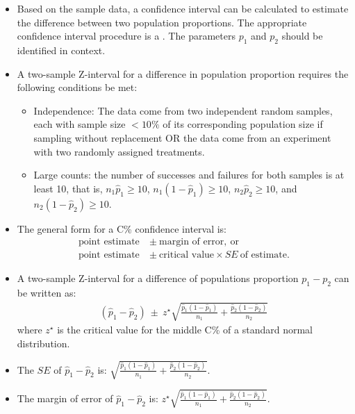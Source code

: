 \begin{itemize}
\item Based on the sample data, a confidence interval can be calculated to
estimate the difference between two population proportions. The appropriate
confidence interval procedure is a .  The parameters $p_1$ and $p_2$ should be identified in context.

\item A two-sample Z-interval for a difference in population proportion requires the following conditions be met:
\begin{itemize}
\item[1.] Independence:  The data come from two independent random samples, each with sample size $<10\%$ of its corresponding population size if sampling without replacement OR the data come from an experiment with two randomly assigned treatments.
\item[2.] Large counts: the number of successes and failures for both samples is at least 10, that is, $n_1\hat{p}_1\ge 10$, $n_1(1-\hat{p}_1)\ge 10$, $n_2\hat{p}_2\ge 10$, and $n_2(1-\hat{p}_2)\ge 10$.
\end{itemize}

\item The general form for a C\% confidence interval is: 
\begin{align*}
\text{point estimate}\ &\pm\ \text{margin of error}, \ \text{or}\\
\text{point estimate}\ &\pm\ \text{critical value} \times SE\ \text{of estimate}.
\end{align*}

\item A two-sample Z-interval for a difference of populations proportion $p_1-p_2$ can be written as:
\begin{align*}
(\hat{p}_1-\hat{p}_2)\  \pm \  z^{\star}\sqrt{\frac{\hat{p}_1(1-\hat{p}_1)}{n_1} + \frac{\hat{p}_2(1-\hat{p}_2)}{n_2}}
\end{align*}
where $z^{\star}$ is the critical value for the middle C\% of a standard normal distribution.  

\item The $SE$ of $\hat{p}_1-\hat{p}_2$ is:  $\sqrt{\frac{\hat{p}_1(1-\hat{p}_1)}{n_1} + \frac{\hat{p}_2(1-\hat{p}_2)}{n_2}}$.

\item The margin of error of $\hat{p}_1-\hat{p}_2$ is:  $z^{\star}\sqrt{\frac{\hat{p}_1(1-\hat{p}_1)}{n_1} + \frac{\hat{p}_2(1-\hat{p}_2)}{n_2}}$.


\end{itemize}
